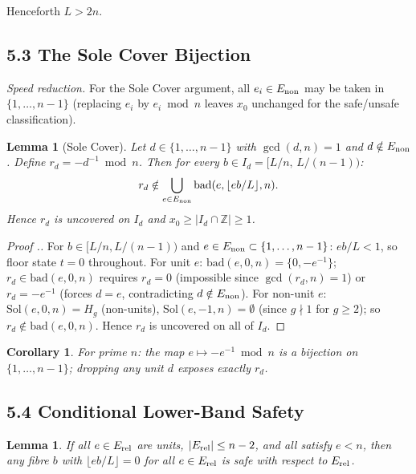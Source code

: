 \documentclass[11pt,a4paper]{article}
\theoremstyle{plain}
\newtheorem{lemma}[theorem]{Lemma}
\newtheorem{corollary}[theorem]{Corollary}
\theoremstyle{definition}
\theoremstyle{remark}
\begin{document}
Henceforth $L > 2n$.


\subsection{5.3 The Sole Cover Bijection}


\textit{Speed reduction.} For the Sole Cover argument, all $e_i \in E_{\rm non}$ may be taken in $\{1,\ldots,n-1\}$ (replacing $e_i$ by $e_i \bmod n$ leaves $x_0$ unchanged for the safe/unsafe classification).


\begin{lemma}[Sole Cover]
Let $d \in \{1,\ldots,n-1\}$ with $\gcd(d,n)=1$ and $d \notin E_{\rm non}$. Define $r_d = -d^{-1} \bmod n$. Then for every $b \in I_d = [L/n,\, L/(n-1))$:
$$r_d \notin \bigcup_{e \in E_{\rm non}} \mathrm{bad}(e, \lfloor eb/L \rfloor, n).$$
\textit{Hence $r_d$ is uncovered on $I_d$ and $x_0 \geq |I_d \cap \mathbb{Z}| \geq 1$.}

\end{lemma}

\begin{proof}[Proof .]
For $b \in [L/n, L/(n-1))$ and $e \in E_{\rm non} \subset \{1,\ldots,n-1\}$: $eb/L < 1$, so floor state $t=0$ throughout. For unit $e$: $\mathrm{bad}(e,0,n) = \{0, -e^{-1}\}$; $r_d \in \mathrm{bad}(e,0,n)$ requires $r_d = 0$ (impossible since $\gcd(r_d,n)=1$) or $r_d = -e^{-1}$ (forces $d = e$, contradicting $d \notin E_{\rm non}$). For non-unit $e$: $\mathrm{Sol}(e,0,n) = H_g$ (non-units), $\mathrm{Sol}(e,-1,n) = \emptyset$ (since $g \nmid 1$ for $g \geq 2$); so $r_d \notin \mathrm{bad}(e,0,n)$. Hence $r_d$ is uncovered on all of $I_d$.
\end{proof}


\begin{corollary}
For prime $n$: the map $e \mapsto -e^{-1} \bmod n$ is a bijection on $\{1,\ldots,n-1\}$; dropping any unit $d$ exposes exactly $r_d$.

\end{corollary}


\subsection{5.4 Conditional Lower-Band Safety}



\begin{lemma}
If all $e \in E_{\rm rel}$ are units, $|E_{\rm rel}| \leq n-2$, and all satisfy $e < n$, then any fibre $b$ with $\lfloor eb/L \rfloor = 0$ for all $e \in E_{\rm rel}$ is safe with respect to $E_{\rm rel}$.

\end{lemma}
\end{document}
